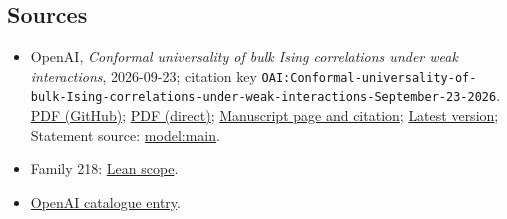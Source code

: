 \documentclass[11pt]{article}
\begin{document}
\subsection{Sources}
\begin{itemize}
\item OpenAI, \emph{Conformal universality of bulk Ising correlations under weak interactions}, 2026-09-23; citation key \texttt{OAI:Conformal-universality-of-bulk-Ising-correlations-under-weak-interactions-September-23-2026}. \href{https://github.com/openai/math/blob/adc7f1241b42e322a6451854ab7e4b4c146bf78a/preprints/Conformal-universality-of-bulk-Ising-correlations-under-weak-interactions-September-23-2026/paper.pdf}{PDF (GitHub)}; \href{https://github.com/openai/math/raw/adc7f1241b42e322a6451854ab7e4b4c146bf78a/preprints/Conformal-universality-of-bulk-Ising-correlations-under-weak-interactions-September-23-2026/paper.pdf}{PDF (direct)}; \href{https://github.com/openai/math/blob/adc7f1241b42e322a6451854ab7e4b4c146bf78a/preprints/Conformal-universality-of-bulk-Ising-correlations-under-weak-interactions-September-23-2026/README.md}{Manuscript page and citation}; \href{https://github.com/openai/math/blob/main/preprints/Conformal-universality-of-bulk-Ising-correlations-under-weak-interactions-September-23-2026/paper.pdf}{Latest version}; Statement source: \href{https://github.com/openai/math/blob/adc7f1241b42e322a6451854ab7e4b4c146bf78a/preprints/Conformal-universality-of-bulk-Ising-correlations-under-weak-interactions-September-23-2026/build/sections/model.tex\#L61}{model:main}.
\item Family 218: \href{https://github.com/openai/math/blob/adc7f1241b42e322a6451854ab7e4b4c146bf78a/lean/docs/218.md}{Lean scope}.
\item \href{https://github.com/openai/math/blob/adc7f1241b42e322a6451854ab7e4b4c146bf78a/CONTENTS.md}{OpenAI catalogue entry}.
\end{itemize}
\end{document}
